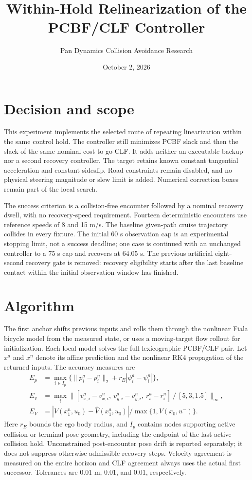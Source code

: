 \documentclass[11pt]{article}
\title{Within-Hold Relinearization of the PCBF/CLF Controller}
\author{Pan Dynamics Collision Avoidance Research}
\date{October 2, 2026}
\begin{document}
\maketitle
\section{Decision and scope}
This experiment implements the selected route of repeating linearization
within the same control hold. The controller still minimizes PCBF slack and
then the slack of the same nominal cost-to-go CLF. It adds neither an
executable backup nor a second recovery controller. The target retains known
constant tangential acceleration and constant sideslip. Road constraints
remain disabled, and no physical steering magnitude or slew limit is added.
Numerical correction boxes remain part of the local search.

The success criterion is a collision-free encounter followed by a nominal
recovery dwell, with no recovery-speed requirement. Fourteen deterministic
encounters use reference speeds of 8 and 15 m/s. The baseline given-path
cruise trajectory collides in every fixture. The initial 60 s observation cap is an
experimental stopping limit, not a success deadline; one case is continued
with an unchanged controller to a 75 s cap and recovers at 64.05 s. The previous artificial
eight-second recovery gate is removed: recovery eligibility starts after the
last baseline contact within the initial observation window has finished.

\section{Algorithm}
The first anchor shifts previous inputs and rolls them through the nonlinear
Fiala bicycle model from the measured state, or uses a moving-target flow
rollout for initialization. Each local model solves the full lexicographic
PCBF/CLF pair. Let $x^{a}$ and $x^{n}$ denote its affine prediction and the
nonlinear RK4 propagation of the returned inputs. The accuracy measures are
\begin{align*}
 E_p&=\max_{i\in I_p}\{\|p_i^a-p_i^n\|_2+r_E|\psi_i^a-\psi_i^n|\},\\
 E_v&=\max_i\|[v_{x,i}^a-v_{x,i}^n,\ v_{y,i}^a-v_{y,i}^n,\ r_i^a-r_i^n]
                     \mathbin{/}[5,3,1.5]\|_\infty,\\
 E_V&=|V(x_1^n,u_0)-\widehat V(x_1^a,u_0)|/\max\{1,V(x_0,u^-)\}.
\end{align*}
Here $r_E$ bounds the ego body radius, and $I_p$ contains nodes supporting
active collision or terminal pose geometry, including the endpoint of the
last active collision hold. Unconstrained post-encounter pose drift is
reported separately; it does not suppress otherwise admissible recovery
steps. Velocity agreement is measured on the entire horizon and CLF agreement
always uses the actual first successor. Tolerances are 0.01 m, 0.01, and
0.01, respectively.
\end{document}
